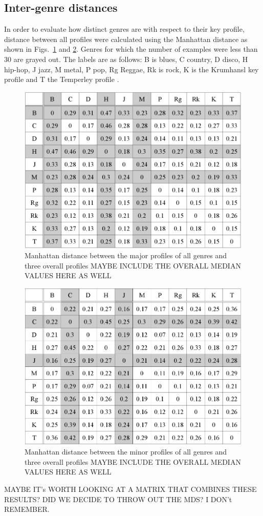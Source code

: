 \documentclass{article}
\begin{document}
\subsection{Inter-genre distances}
In order to evaluate how distinct genres are with respect to their key profile, distance between all profiles were calculated using the Manhattan distance as shown in Figs.~\ref{fig:distance_major} and \ref{fig:distance_minor}. Genres for which the number of examples were less than 30 are grayed out. The labels are as follows: B is blues, C country, D disco, H hip-hop, J jazz, M metal, P pop, Rg Reggae, Rk is rock, K is the Krumhansl key profile and T the Temperley profile \cite{temperley_tonal_2007}.
\begin{figure}[tb]
    \includegraphics[scale=.4]{graph/majorDistManhattan}
	\caption{Manhattan distance between the major profiles of all genres and three overall profiles MAYBE INCLUDE THE OVERALL MEDIAN VALUES HERE AS WELL}
	\label{fig:distance_major}
\end{figure}
\begin{figure}[tb]
    \includegraphics[scale=.4]{graph/minorDistManhattan}
	\caption{Manhattan distance between the minor profiles of  all genres and three overall profiles MAYBE INCLUDE THE OVERALL MEDIAN VALUES HERE AS WELL}
	\label{fig:distance_minor}
\end{figure}
MAYBE IT's WORTH LOOKING AT A MATRIX THAT COMBINES THESE RESULTS? DID WE DECIDE TO THROW OUT THE MDS? I DON't REMEMBER.
\end{document}
